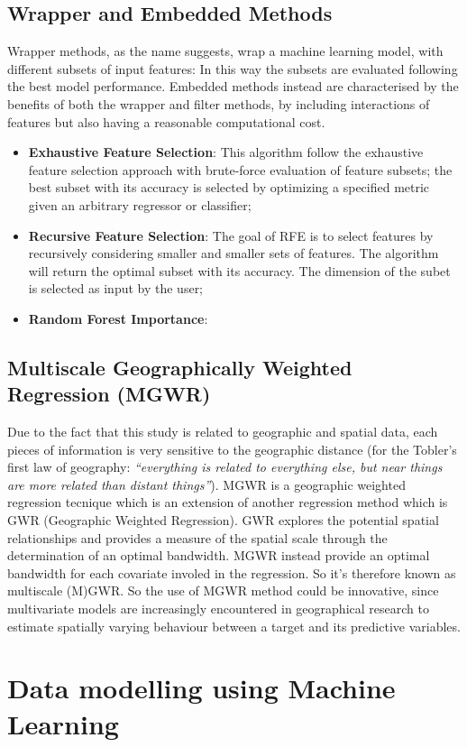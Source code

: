 \subsection{Wrapper and Embedded Methods}
Wrapper methods, as the name suggests, wrap a machine learning model, with different subsets of input features: In this way the subsets are  evaluated following the best model performance.
Embedded methods instead are characterised by the benefits of both the wrapper and filter methods, by including interactions of features but also having a reasonable computational cost.
\begin{itemize}
\item \textbf{Exhaustive Feature Selection}: This algorithm follow the exhaustive feature selection approach with brute-force evaluation of feature subsets; the best subset with its accuracy is selected by optimizing a specified metric given an arbitrary regressor or classifier;
\item \textbf{Recursive Feature Selection}: The goal of RFE is to select features by recursively considering smaller and smaller sets of features. The algorithm will return the optimal subset with its accuracy. The dimension of the subet is selected as input by the user; 
\item \textbf{Random Forest Importance}:
\end{itemize}
\subsection{Multiscale Geographically Weighted Regression (MGWR)}
Due to the fact that this study is related to geographic and spatial data, each pieces of information is very sensitive to the geographic distance (for the Tobler’s first law of geography: \textit{“everything is related to everything else, but near things are more related than distant things”}). MGWR is a geographic weighted regression tecnique which is an extension of another regression method which is GWR (Geographic Weighted Regression). GWR explores the potential spatial relationships and provides a measure of the spatial scale through the determination of an optimal bandwidth. MGWR instead provide an optimal bandwidth for each covariate involed in the regression. So it's therefore known as multiscale (M)GWR. So the use of MGWR method could be innovative, since multivariate models are increasingly encountered in geographical research to estimate spatially varying behaviour between a target and its predictive variables.




\section{Data modelling using Machine Learning}

